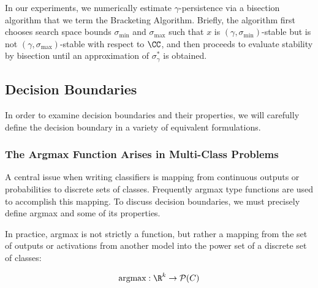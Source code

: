 In our experiments, we numerically estimate $\gamma$-persistence via a bisection algorithm that we term the Bracketing Algorithm.  Briefly, the algorithm first chooses search space bounds $\sigma_{\min}$ and $\sigma_{\max}$ such that $x$ is  $(\gamma,\sigma_{\min})$-stable but is not $(\gamma,\sigma_{\max})$-stable with respect to $\CC$, and then proceeds to evaluate stability by bisection until an approximation of $\sigma_\gamma^*$ is obtained.





\subsection{Decision Boundaries} \label{subsec:db}

In order to examine decision boundaries and their properties, we will carefully define the decision boundary in a variety of equivalent formulations. 

\subsubsection{The Argmax Function Arises in Multi-Class Problems}

A central issue when writing classifiers is mapping from continuous outputs or probabilities to discrete sets of classes. Frequently argmax type functions are used to accomplish this mapping. To discuss decision boundaries, we must precisely define argmax and some of its properties. 

In practice, argmax is not strictly a function, but rather a mapping from the set of outputs or activations from another model into the power set of a discrete set of classes:

\begin{equation}
    \text{argmax} : \R^k \to \mathcal{P}(C)
\end{equation}

